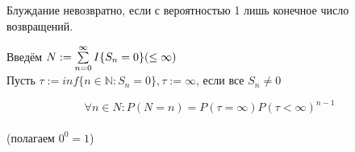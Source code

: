 \begin{opr}
Блуждание невозвратно, если с вероятностью 1 лишь конечное число возвращений.
\end{opr}

Введём $N:=\sum\limits_{n=0}^\infty I\{S_n=0\} (\le\infty)$\\
Пусть $\tau := inf\{n\in \mathbb{N}:S_n = 0\}, \tau := \infty$, если все $S_n \ne 0$

\begin{lem}
$$\forall n \in N: P(N=n) = P (\tau = \infty)P(\tau<\infty)^{n-1}$$\\(полагаем $0^0 = 1$)
\end{lem}








